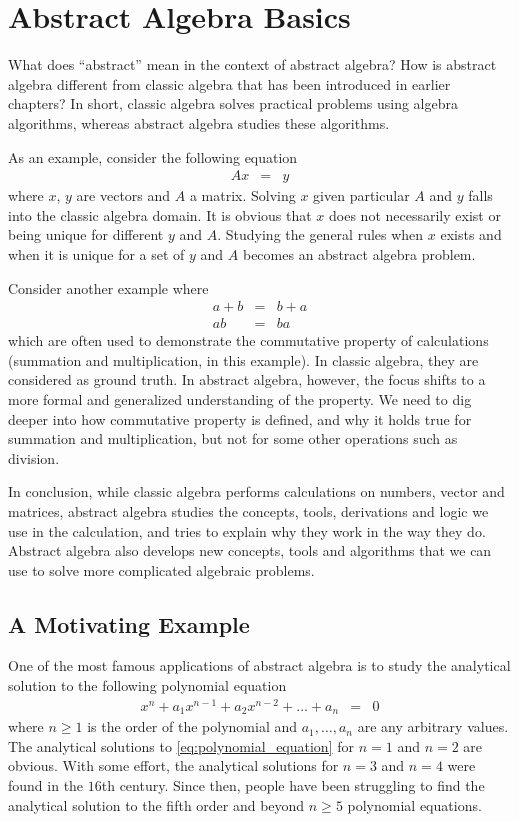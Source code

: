 \chapter{Abstract Algebra Basics}

What does ``abstract'' mean in the context of abstract algebra? How is abstract algebra different from classic algebra that has been introduced in earlier chapters? In short, classic algebra solves practical problems using algebra algorithms, whereas abstract algebra studies these algorithms.

As an example, consider the following equation
\begin{eqnarray}
  Ax &=& y \nonumber
\end{eqnarray}
where $x$, $y$ are vectors and $A$ a matrix. Solving $x$ given particular $A$ and $y$ falls into the classic algebra domain. It is obvious that $x$ does not necessarily exist or being unique for different $y$ and $A$. Studying the general rules when $x$ exists and when it is unique for a set of $y$ and $A$ becomes an abstract algebra problem.

Consider another example where
\begin{eqnarray}
 a+b &=& b+a \nonumber \\
  ab &=& ba \nonumber
\end{eqnarray}
which are often used to demonstrate the commutative property of calculations (summation and multiplication, in this example). In classic algebra, they are considered as ground truth. In abstract algebra, however, the focus shifts to a more formal and generalized understanding of the property. We need to dig deeper into how commutative property is defined, and why it holds true for summation and multiplication, but not for some other operations such as division.

In conclusion, while classic algebra performs calculations on numbers, vector and matrices, abstract algebra studies the concepts, tools, derivations and logic we use in the calculation, and tries to explain why they work in the way they do. Abstract algebra also develops new concepts, tools and algorithms that we can use to solve more complicated algebraic problems.

\section{A Motivating Example}

One of the most famous applications of abstract algebra is to study the analytical solution to the following polynomial equation
\begin{eqnarray}
  x^n + a_1x^{n-1} + a_2x^{n-2} + \ldots + a_n &=& 0 \label{eq:polynomial_equation}
\end{eqnarray}
where $n\geq 1$ is the order of the polynomial and $a_1, \ldots, a_n$ are any arbitrary values. The analytical solutions to \eqref{eq:polynomial_equation} for $n=1$ and $n=2$ are obvious. With some effort, the analytical solutions for $n=3$ and $n=4$ were found in the $16$th century. Since then, people have been struggling to find the analytical solution to the fifth order and beyond $n\geq5$ polynomial equations.

